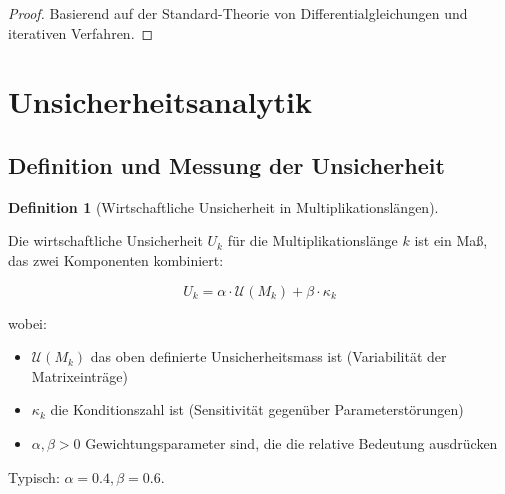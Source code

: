 \documentclass[a4paper,12pt]{article}
\theoremstyle{definition}
\newtheorem{definition}{Definition}
\begin{document}
\begin{proof}

Basierend auf der Standard-Theorie von Differentialgleichungen und iterativen Verfahren.

\end{proof}

\section{Unsicherheitsanalytik}

\subsection{Definition und Messung der Unsicherheit}

\begin{definition}[Wirtschaftliche Unsicherheit in Multiplikationslängen]
\label{def:econ_unsicherheit}

Die wirtschaftliche Unsicherheit $U_k$ für die Multiplikationslänge $k$ ist ein Maß, das zwei Komponenten kombiniert:

\begin{equation}
U_k = \alpha \cdot \mathcal{U}(M_k) + \beta \cdot \kappa_k
\end{equation}

wobei:

\begin{itemize}
\item $\mathcal{U}(M_k)$ das oben definierte Unsicherheitsmass ist (Variabilität der Matrixeinträge)
\item $\kappa_k$ die Konditionszahl ist (Sensitivität gegenüber Parameterstörungen)
\item $\alpha, \beta > 0$ Gewichtungsparameter sind, die die relative Bedeutung ausdrücken
\end{itemize}

Typisch: $\alpha = 0.4, \beta = 0.6$.

\end{definition}
\end{document}
